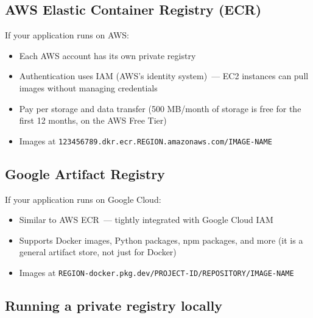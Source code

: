 \subsection*{AWS Elastic Container Registry (ECR)}\label{19-artifact-storage:aws-elastic-container-registry-ecr}

If your application runs on AWS:

\begin{itemize}
\tightlist
\item
  Each AWS account has its own private registry
\item
  Authentication uses IAM (AWS's identity system)~--- EC2 instances can pull images without managing credentials
\item
  Pay per storage and data transfer (500 MB/month of storage is free for the first 12 months, on the AWS Free Tier)
\item
  Images at \texttt{123456789.}\allowbreak{}\texttt{dkr.}\allowbreak{}\texttt{ecr.}\allowbreak{}\texttt{REGION.}\allowbreak{}\texttt{amazonaws.}\allowbreak{}\texttt{com/}\allowbreak{}\texttt{IMAGE-}\allowbreak{}\texttt{NAME}
\end{itemize}

\subsection*{Google Artifact Registry}\label{19-artifact-storage:google-artifact-registry}

If your application runs on Google Cloud:

\begin{itemize}
\tightlist
\item
  Similar to AWS ECR~--- tightly integrated with Google Cloud IAM
\item
  Supports Docker images, Python packages, npm packages, and more (it is a general artifact store, not just for Docker)
\item
  Images at \texttt{REGION-}\allowbreak{}\texttt{docker.}\allowbreak{}\texttt{pkg.}\allowbreak{}\texttt{dev/}\allowbreak{}\texttt{PROJECT-}\allowbreak{}\texttt{ID/}\allowbreak{}\texttt{REPOSITORY/}\allowbreak{}\texttt{IMAGE-}\allowbreak{}\texttt{NAME}
\end{itemize}

\subsection*{Running a private registry locally}\label{19-artifact-storage:running-a-private-registry-locally}


